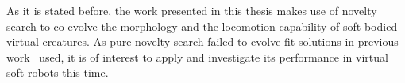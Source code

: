 As it is stated before, the work presented in this thesis makes use of novelty search to co-evolve the morphology and the locomotion capability of soft bodied virtual creatures. As pure novelty search failed to evolve fit solutions in previous work~\citep{lehman2011evolving} used, it is of interest to apply and investigate its performance in virtual soft robots this time.

